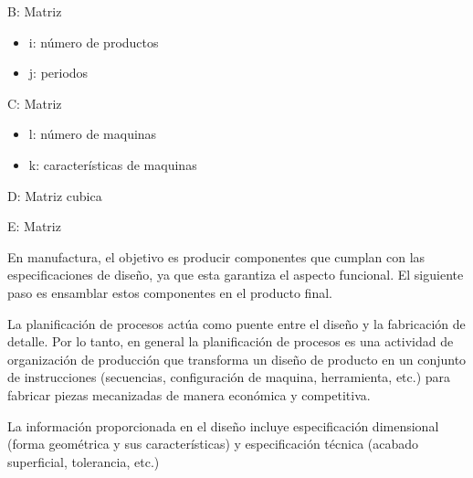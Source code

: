 B: Matriz
\begin{itemize}
    \item i: número de productos
    \item j: periodos
\end{itemize}

C: Matriz 
\begin{itemize}
    \item l: número de maquinas
    \item k: características de maquinas 
\end{itemize}

D: Matriz cubica 

E: Matriz 

En manufactura, el objetivo es producir componentes que cumplan con las especificaciones de diseño, ya que esta garantiza el aspecto funcional. El siguiente paso es ensamblar estos componentes en el producto final. 

La planificación de procesos actúa como puente entre el diseño y la fabricación de detalle. Por lo tanto, en general la planificación de procesos es una actividad de organización de producción que transforma un diseño de producto en un conjunto de instrucciones (secuencias, configuración de maquina, herramienta, etc.) para fabricar piezas mecanizadas de manera económica y competitiva. 

La información proporcionada en el diseño incluye especificación dimensional (forma geométrica y sus características) y especificación técnica (acabado superficial, tolerancia, etc.)